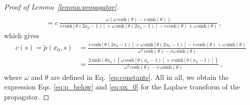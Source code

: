 \documentclass[preprint,12pt]{elsarticle}
\numberwithin{equation}{section}
\theoremstyle{plain} \newtheorem{theorem}{Theorem}[section]
\theoremstyle{plain} \newtheorem{proposition}[theorem]{Proposition}
\theoremstyle{plain} \newtheorem{lemma}[theorem]{Lemma}
\theoremstyle{plain} \newtheorem{corollary}[theorem]{Corollary}
\theoremstyle{definition} \newtheorem{definition}[theorem]{Definition}
\theoremstyle{definition} \newtheorem{notation}[theorem]{Notation}
\theoremstyle{remark} \newtheorem{remark}[theorem]{Remark}
\theoremstyle{remark} \newtheorem{remarks}[theorem]{Remarks}
\theoremstyle{remark} \newtheorem{algorithm2}[theorem]{Algorithm}
\theoremstyle{remark} \newtheorem{example}[theorem]{Example}
\begin{document}
\begin{appendices}
\begin{proof}[Proof of Lemma~\ref{lemma:propagator}]
\begin{align*}
	\\
	&=c\, \frac{\omega (\omega \, \mathrm{cosh}(\theta)-v \, \mathrm{sinh}(\theta))}{v \, \mathrm{cosh}[\theta (2x_0-1)]+\omega \, \mathrm{sinh}[\theta (2x_0-1)] -v\, \mathrm{cosh}(\theta)+\omega \, \mathrm{sinh}(\theta)}\,,
\end{align*}
which gives
\begin{align*}
	c(s)=\tilde{p}(x_0, s)
	&=\frac{v \, \mathrm{cosh}[\theta(2x_0-1)]+\omega \, \mathrm{sinh}[\theta(2x_0-1)]-v \, \mathrm{cosh}(\theta)+\omega \, \mathrm{sinh}(\theta)}{\omega^2 \, \mathrm{cosh}(\theta)-v\omega \, \mathrm{sinh}(\theta)}
	\\
	&=\frac{2 \, \mathrm{sinh}(\theta x_0)\left\{\omega \, \mathrm{cosh}[\theta(x_0-1)]+v \, \mathrm{sinh}[\theta(x_0-1)]\right\}}{\omega^2 \, \mathrm{cosh}(\theta)-v \, \omega\mathrm{sinh}(\theta)}\,,
\end{align*}
where $\omega$ and $\theta$ are defined in Eq.~\eqref{eq:constants}.
All in all, we obtain the expression Eqs. \eqref{eq:p_below}
and \eqref{eq:px_0}
for the Laplace transform of the propagator. 
\end{proof}


\end{appendices}
\end{document}
